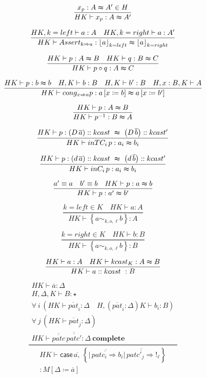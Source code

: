 \begin{figure}
\[
\frac{x_{p}:A\thickapprox A'\in H}{HK\vdash x_{p}:A\thickapprox A'}
\]

\[
\frac{HK,k=left\vdash a:A\quad HK,k=right\vdash a:A'}{HK\vdash Assert_{k\Rightarrow a}:\left\lfloor a\right\rfloor _{k=left}\thickapprox\left\lfloor a\right\rfloor _{k=right}}
\]


\[
\frac{HK\vdash p:A\thickapprox B\quad HK\vdash q:B\thickapprox C}{HK\vdash p\circ q:A\thickapprox C}
\]

\[
\frac{HK\vdash p:b\thickapprox b\quad H,K\vdash b:B\quad H,K\vdash b':B\quad H,x:B,K\vdash A}{HK\vdash cong_{x\Rightarrow a}p:a\left[x\coloneqq b\right]\thickapprox a\left[x\coloneqq b'\right]}
\]

\[
\frac{HK\vdash p:A\thickapprox B}{HK\vdash p^{-1}:B\thickapprox A}
\]

\[
\frac{HK\vdash p:\left(D\,\overline{a}\right)::kcast\ \thickapprox\ \left(D\,\overline{b}\right)::kcast'}{HK\vdash inTC_{i}\,p:a_{i}\thickapprox b_{i}}
\]


\[
\frac{HK\vdash p:\left(d\,\overline{a}\right)::kcast\ \thickapprox\ \left(d\,\overline{b}\right)::kcast'}{HK\vdash inC_{i}\,p:a_{i}\thickapprox b_{i}}
\]



\[
\frac{a'\equiv a\quad b'\equiv b\quad HK\vdash p:a\thickapprox b}{HK\vdash p:a'\thickapprox b'}
\]


\[
\frac{k=left\in K\quad HK\vdash a:A}{HK\vdash\left\{ a\sim_{k,o,\ell}b\right\} :A}
\]

\[
\frac{k=right\in K\quad HK\vdash b:B}{HK\vdash\left\{ a\sim_{k,o,\ell}b\right\} :B}
\]

\[
\frac{HK\vdash a:A\quad HK\vdash kcast_{K}:A\thickapprox B}{HK\vdash a::kcast\ :B}
\]

\[
\frac{\begin{array}{c}
HK\vdash\overline{a}:\Delta\\
H,\Delta,K\vdash B:\star\\
\forall\:i\,\left(HK\vdash\overline{pat}_{i}:\Delta\quad H,\left(\overline{pat}_{i}:\Delta\right)K\vdash b_{i}:B\right)\\
\forall\:j\,\left(HK\vdash\overline{pat}_{j}:\Delta\right)\\
HK\vdash\overline{\overline{patc}}\,\overline{\overline{patc'}}:\Delta\ \mathbf{complete}
\end{array}}{\begin{array}{c}
HK\vdash\mathsf{case}\,\overline{a,}\,\left\{ \overline{|\,\overline{patc_{i}\Rightarrow}b_{i}}\overline{|\,\overline{patc'_{j}\Rightarrow}!_{\ell}}\right\} \\
:M\left[\Delta\coloneqq\overline{a}\right]
\end{array}}
\]


\end{figure}
